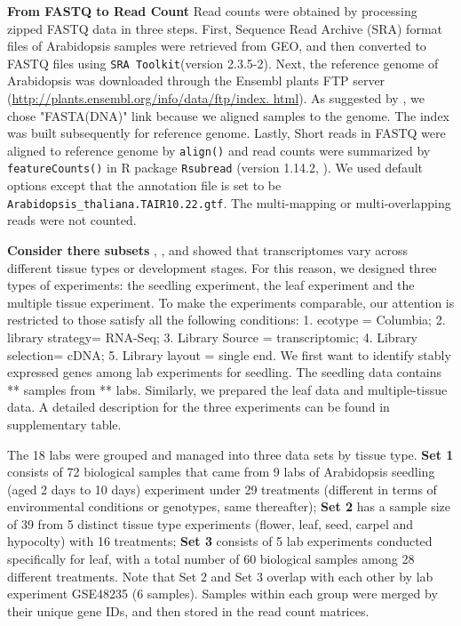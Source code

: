 \documentclass[11pt, a4paper]{article}
\begin{document}
\textbf{From FASTQ to Read Count} Read counts were obtained by processing
zipped FASTQ data in three steps. First, Sequence Read Archive (SRA) format
files of Arabidopsis samples were retrieved from GEO, and then converted to
FASTQ files using \verb"SRA Toolkit"(version 2.3.5-2). Next, the reference
genome of Arabidopsis was downloaded  through the Ensembl plants FTP server
(\url{http://plants.ensembl.org/info/data/ftp/index. html}). As suggested by
\cite{anders2013count},  we chose "FASTA(DNA)" link because we aligned samples 
to the genome.
The index  was built subsequently for reference genome.  Lastly, Short reads
in FASTQ were  aligned to reference genome by  \verb"align()" and read counts
were summarized by \verb"featureCounts()" in R package \verb"Rsubread"
(version 1.14.2,  \cite{liao2013subread}). We used default options except that
the annotation file is set to be \verb"Arabidopsis_thaliana.TAIR10.22.gtf".
The multi-mapping or multi-overlapping reads were not counted.  


\textbf{Consider there subsets} 
\cite{czechowski2005genome}, \cite{hruz2011refgenes}, and
\cite{dekkers2012identification} showed that transcriptomes vary across
different tissue types or development stages. For this reason, we designed three 
types of experiments: the seedling experiment, the leaf experiment and the multiple tissue
experiment. To make the experiments comparable, our attention is restricted to those satisfy all the following conditions:  1. ecotype = Columbia; 2. library strategy= RNA-Seq; 3. Library Source = transcriptomic; 4. Library selection= cDNA; 5. Library layout = single end. 
We first want to identify stably expressed genes among lab experiments for seedling. The seedling data contains  **  samples from ** labs.
Similarly, we prepared the leaf data and multiple-tissue data.  A detailed description for the three experiments can be found in supplementary table. 


The 18 labs were grouped and managed into three data sets by tissue type.
\textbf{Set 1} consists of 72 biological
samples that came from 9 labs of Arabidopsis seedling (aged 2 days to 10 days)
experiment under 29 treatments (different in terms of environmental conditions
or genotypes, same thereafter); \textbf{Set 2} has a sample size of 39 from 5
distinct tissue type experiments (flower, leaf, seed, carpel and hypocolty)
with 16 treatments; \textbf{Set 3} consists of 5 lab experiments conducted
specifically for leaf, with a total number of 60 biological samples among 28
different treatments. Note that  Set 2 and Set 3 overlap with each other by
lab experiment GSE48235 (6 samples). Samples within each group were merged by
their unique gene IDs, and then stored in the read count matrices.  \\
\end{document}
